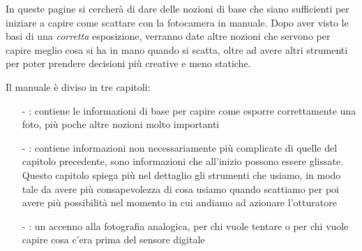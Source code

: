 In queste pagine si cercherà di dare delle nozioni di base che siano sufficienti per iniziare a capire come scattare con la fotocamera in manuale.
Dopo aver visto le basi di una \textit{corretta} esposizione, verranno date altre nozioni che servono per capire meglio cosa si ha in mano quando si scatta, oltre ad avere altri strumenti per poter prendere decisioni più creative e meno statiche.

Il manuale è diviso in tre capitoli:
\begin{itemize}
    \item[-] \textbf{}: contiene le informazioni di base per capire come esporre correttamente una foto, più poche altre nozioni molto importanti
    \item[-] \textbf{}: contiene informazioni non necessariamente più complicate di quelle del capitolo precedente, sono informazioni che all'inizio possono essere glissate. Questo capitolo spiega più nel dettaglio gli strumenti che usiamo, in modo tale da avere più consapevolezza di cosa usiamo quando scattiamo per poi avere più possibilità nel momento in cui andiamo ad azionare l'otturatore
    \item[-] \textbf{}: un accenno alla fotografia analogica, per chi vuole tentare o per chi vuole capire cosa c'era prima del sensore digitale
\end{itemize}